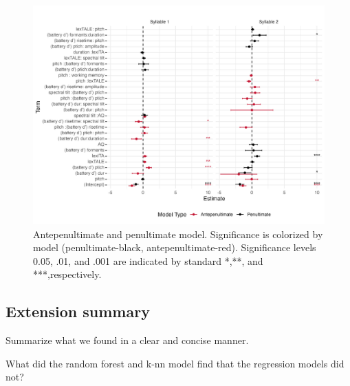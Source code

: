 \begin{figure}[H]
  \centering
  \includegraphics[width=1\linewidth]{visuals/extended_analysis.jpeg} %
  \caption{Antepenultimate and penultimate model. Significance is colorized by model (penultimate-black, antepenultimate-red). Significance levels 0.05, .01, and .001 are indicated by standard *,**, and ***,respectively.}
  \label{fig:extened_analysis}
\end{figure}


\subsection{Extension summary}
Summarize what we found in a clear and concise manner.

What did the random forest and k-nn model find that the regression models did not? 
